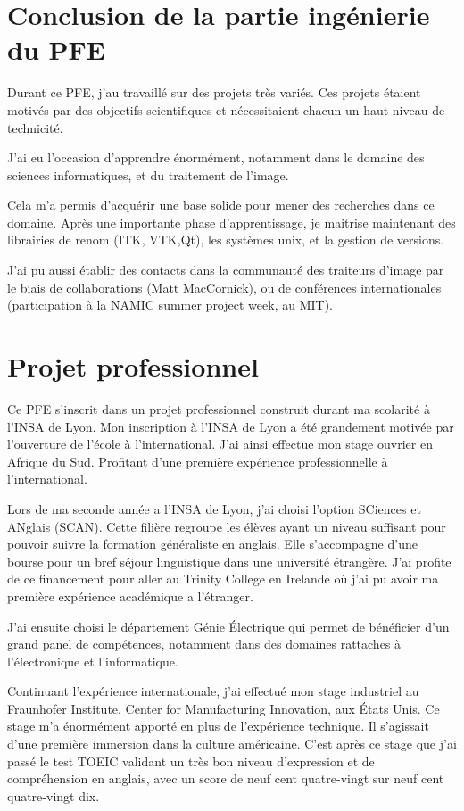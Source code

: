 \section{Conclusion de la partie ingénierie du PFE}

Durant ce PFE, j'au travaillé sur des projets très variés.
Ces projets étaient motivés par des objectifs scientifiques et nécessitaient chacun un haut niveau de technicité.

J'ai eu l'occasion d'apprendre énormément,
notamment dans le domaine des sciences informatiques,
et du traitement de l'image.

Cela m'a permis d'acquérir une base solide pour mener des recherches dans ce domaine.
Après une importante phase d'apprentissage, je maitrise maintenant des librairies de renom
(ITK, VTK,Qt), les systèmes unix, et la gestion de versions.

J'ai pu aussi établir des contacts dans la communauté des traiteurs d'image par le biais de collaborations
(Matt MacCornick), ou de conférences internationales (participation à la NAMIC summer project week, au MIT).

\section{Projet professionnel}

Ce PFE s'inscrit dans un projet professionnel construit durant ma scolarité à l'INSA de Lyon.
Mon inscription à l'INSA de Lyon a été grandement motivée par l'ouverture de l'école à l'international. J'ai ainsi effectue mon stage ouvrier en Afrique du Sud. Profitant d'une première expérience professionnelle à l'international.

Lors de ma seconde année a l'INSA de Lyon, j'ai choisi l'option SCiences et ANglais (SCAN).
Cette filière regroupe les élèves ayant un niveau suffisant pour pouvoir suivre la formation généraliste en anglais.
Elle s'accompagne d'une bourse pour un bref séjour linguistique dans une université étrangère.
J'ai profite de ce financement pour aller au Trinity College en Irelande où
j'ai pu avoir ma première expérience académique a l'étranger.

J'ai ensuite choisi le département Génie Électrique qui permet de bénéficier d'un grand panel de compétences,
notamment dans des domaines rattaches à l'électronique et l'informatique.

Continuant l'expérience internationale, j'ai effectué mon stage industriel au
Fraunhofer Institute, Center for Manufacturing Innovation, aux États Unis.
Ce stage m'a énormément apporté en plus de l'expérience technique.
Il s'agissait d'une première immersion dans la culture américaine.
C'est après ce stage que j'ai passé le test TOEIC validant un très bon niveau d'expression et de compréhension en anglais,
avec un score de neuf cent quatre-vingt sur neuf cent quatre-vingt dix.

